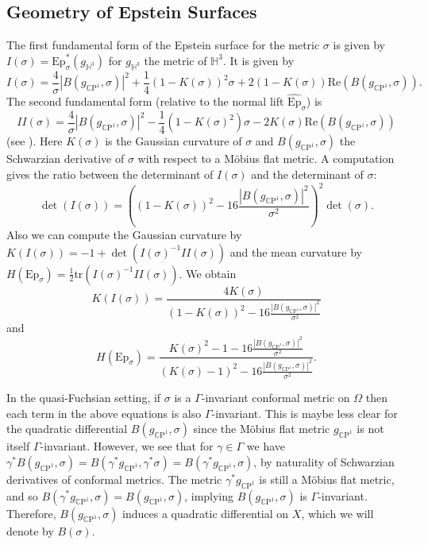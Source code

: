 \documentclass{amsart}
\newcommand{\CP}{\mathbb{C}\mathrm{P}}
\renewcommand{\H}{\mathbb{H}}
\newcommand{\two}{I\!\!I}
\begin{document}
\subsection{Geometry of Epstein Surfaces}\label{epstein-geometry}



The first fundamental form of the Epstein surface for the metric $\sigma$ is given by $I(\sigma) = \mathrm{Ep}_\sigma^*(g_{\H^3})$ for $g_{\H^3}$ the metric of $\H^3$. 
It is given by 
\[
I(\sigma) = \frac{4}{\sigma}|B(g_{\CP^1},\sigma)|^2 + \frac{1}{4}(1-K(\sigma))^2\sigma + 2(1-K(\sigma))\text{Re}(B(g_{\CP^1},\sigma)).
\]
The second fundamental form (relative to the normal lift $\widehat{\mathrm{Ep}}_\sigma$) is 
\[
\two(\sigma)
= \frac{4}{\sigma}|B(g_{\CP^1},\sigma)|^2 - \frac{1}{4} (1 - K(\sigma)^2)\sigma - 2 K(\sigma) \text{Re}(B(g_{\CP^1},\sigma))
\]
(see \cite[Eqns.~3.2-3.3]{dumas2017}).
Here $K(\sigma)$ is the Gaussian curvature of $\sigma$ and $B(g_{\CP^1},\sigma)$ the Schwarzian derivative of $\sigma$ with respect to a M\"obius flat metric. 
A computation gives the ratio between the determinant of $I(\sigma)$ and the determinant of $\sigma$:
\[
\det(I(\sigma)) = \left( (1-K(\sigma))^2 - 16 \frac{|B(g_{\CP^1},\sigma)|^2}{\sigma^2} \right)^2 \det(\sigma).
\]
Also we can compute the Gaussian curvature by $K(I(\sigma)) = -1 + \det(I(\sigma)^{-1}\two(\sigma))$ and the mean curvature by $H(\mathrm{Ep}_\sigma) = \frac{1}{2}\mathrm{tr}(I(\sigma)^{-1}\two(\sigma))$. 
We obtain
\[
K(I(\sigma))
= \frac{4K(\sigma)}{(1-K(\sigma))^2 - 16 \frac{|B(g_{\CP^1},\sigma)|^2}{\sigma^2}}
\]
and
\[
H(\mathrm{Ep}_\sigma)
= \frac{K(\sigma)^2 - 1 - 16 \frac{|B(g_{\CP^1},\sigma)|^2}{\sigma^2}}{(K(\sigma) - 1)^2 - 16 \frac{|B(g_{\CP^1},\sigma)|^2}{\sigma^2}}.
\]

 
In the quasi-Fuchsian setting, if $\sigma$ is a $\Gamma$-invariant conformal metric on $\Omega$ then each term in the above equations is also $\Gamma$-invariant. 
This is maybe less clear for the quadratic differential $B(g_{\CP^1},\sigma)$ since the M\"obius flat metric $g_{\CP^1}$ is not itself $\Gamma$-invariant. 
However, we see that for $\gamma \in \Gamma$ we have $\gamma^*B(g_{\CP^1},\sigma) = B(\gamma^*g_{\CP^1},\gamma^*\sigma) = B(\gamma^* g_{\CP^1},\sigma)$, by naturality of Schwarzian derivatives of conformal metrics. 
The metric $\gamma^* g_{\CP^1}$ is still a M\"obius flat metric, and so $B(\gamma^* g_{\CP^1},\sigma) = B(g_{\CP^1},\sigma)$, implying $B(g_{\CP^1}, \sigma)$ is $\Gamma$-invariant. 
Therefore, $B(g_{\CP^1},\sigma)$ induces a quadratic differential on $X$, which we will denote by $B(\sigma)$.
\end{document}
